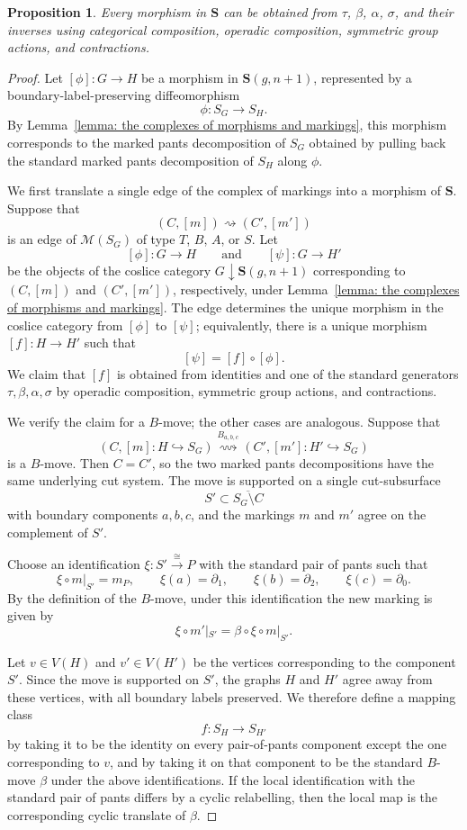 \documentclass[10pt,a4paper]{amsart}
\newtheorem{prop}{Proposition}
\newcommand{\bS}{\mathbf{S}}
\newcommand{\calM}{\mathcal{M}}
\begin{document}
\begin{prop}\label{prop:S-generated-by-standard-moves}
Every morphism in $\bS$ can be obtained from $\tau$, $\beta$, $\alpha$, $\sigma$, and their inverses using categorical composition, operadic composition, symmetric group actions, and contractions.
\end{prop}

\begin{proof} 
Let $[\phi]:G\to H$ be a morphism in $\bS(g,n+1)$, represented by a boundary-label-preserving diffeomorphism
\[
\phi:S_G\longrightarrow S_H.
\]
By Lemma~\ref{lemma: the complexes of morphisms and markings}, this morphism corresponds to the marked pants decomposition of $S_G$ obtained by pulling back the standard marked pants decomposition of $S_H$ along $\phi$.

We first translate a single edge of the complex of markings into a morphism of $\bS$. Suppose that
\[
(C,[m])\rightsquigarrow (C',[m'])
\]
is an edge of $\calM(S_G)$ of type $T$, $B$, $A$, or $S$. Let
\[
[\phi]:G\to H
\qquad\text{and}\qquad
[\psi]:G\to H'
\]
be the objects of the coslice category $G\downarrow\bS(g,n+1)$ corresponding to $(C,[m])$ and $(C',[m'])$, respectively, under Lemma~\ref{lemma: the complexes of morphisms and markings}. The edge determines the unique morphism in the coslice category from $[\phi]$ to $[\psi]$; equivalently, there is a unique morphism $[f]:H\to H'$ such that
\[
[\psi]=[f]\circ[\phi].
\]
We claim that $[f]$ is obtained from identities and one of the standard generators $\tau,\beta,\alpha,\sigma$ by operadic composition, symmetric group actions, and contractions.


We verify the claim for a $B$-move; the other cases are analogous. Suppose that
\[
(C,[m]:H\hookrightarrow S_G)
\overset{B_{a,b,c}}{\rightsquigarrow}
(C',[m']:H'\hookrightarrow S_G)
\]
is a $B$-move. Then $C=C'$, so the two marked pants decompositions have the same underlying cut system. The move is supported on a single cut-subsurface
\[
S'\subset \overline{S_G\setminus C}
\]
with boundary components $a,b,c$, and the markings $m$ and $m'$ agree on the complement of $S'$.

Choose an identification $\xi:S'\xrightarrow{\cong}P$ with the standard pair of pants such that
\[
\xi\circ m|_{S'}=m_P,\qquad
\xi(a)=\partial_1,\qquad
\xi(b)=\partial_2,\qquad
\xi(c)=\partial_0.
\]
By the definition of the $B$-move, under this identification the new marking is given by
\[
\xi\circ m'|_{S'}=\beta\circ \xi\circ m|_{S'}.
\]

Let $v\in V(H)$ and $v'\in V(H')$ be the vertices corresponding to the component $S'$. Since the move is supported on $S'$, the graphs $H$ and $H'$ agree away from these vertices, with all boundary labels preserved. We therefore define a mapping class
\[
f:S_H\longrightarrow S_{H'}
\]
by taking it to be the identity on every pair-of-pants component except the one corresponding to $v$, and by taking it on that component to be the standard $B$-move $\beta$ under the above identifications. If the local identification with the standard pair of pants differs by a cyclic relabelling, then the local map is the corresponding cyclic translate of $\beta$.


\end{proof}
\end{document}

